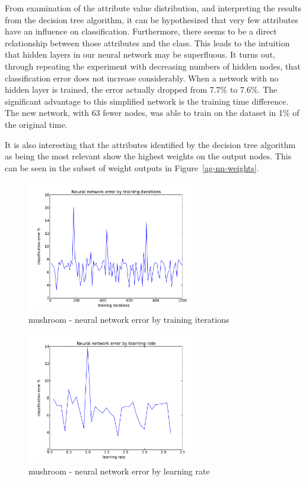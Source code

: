 \documentclass{sig-alternate}
\begin{document}
From examination of the attribute value distribution, and interpreting the results from the decision tree algorithm, it can be hypothesized that very few attributes have an influence on classification. Furthermore, there seems to be a direct relationship between those attributes and the class. This leads to the intuition that hidden layers in our neural network may be superfluous. It turns out, through repeating the experiment with decreasing numbers of hidden nodes, that classification error does not increase considerably. When a network with no hidden layer is trained, the error actually dropped from 7.7\% to 7.6\%. The significant advantage to this simplified network is the training time difference. The new network, with 63 fewer nodes, was able to train on the dataset in 1\% of the original time.

It is also interesting that the attributes identified by the decision tree algorithm as being the most relevant show the highest weights on the output nodes. This can be seen in the subset of weight outputs in Figure~\ref{ag-nn-weights}.


\begin{figure}[!htbp]
    \centering
    \includegraphics[width=3in]{data/agaricus-lepiota/perceptron/training-iterations.pdf}
    \caption{mushroom - neural network error by training iterations \label{ag-nn-ti}}
\end{figure} 

\begin{figure}[!htbp]
    \centering
    \includegraphics[width=3in]{data/agaricus-lepiota/perceptron/learning-rate.pdf}
    \caption{mushroom - neural network error by learning rate \label{ag-nn-lr}}
\end{figure} 
\end{document}

